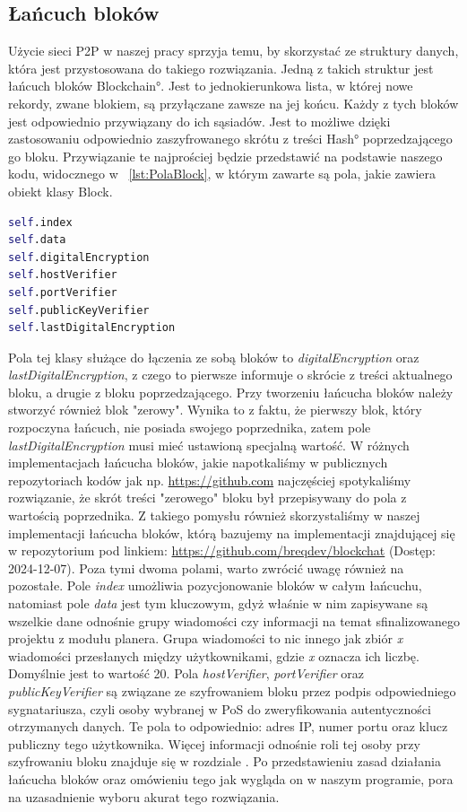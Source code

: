 \subsection{Łańcuch bloków}
\label{sec:Blockchain}
Użycie sieci P2P w naszej pracy sprzyja temu, by skorzystać ze struktury danych, która jest przystosowana do takiego rozwiązania. Jedną z takich struktur jest łańcuch bloków \ang{Blockchain}. Jest to jednokierunkowa lista, w której nowe rekordy, zwane blokiem, są przyłączane zawsze na jej końcu. Każdy z tych bloków jest odpowiednio przywiązany do ich sąsiadów. Jest to możliwe dzięki zastosowaniu odpowiednio zaszyfrowanego skrótu z treści \ang{Hash} poprzedzającego go bloku. Przywiązanie te najprościej będzie przedstawić na podstawie naszego kodu, widocznego w \lstlistingname{~\ref{lst:PolaBlock}}, w którym zawarte są pola, jakie zawiera obiekt klasy Block.
\begin{lstlisting}[language=Python, extendedchars=true, caption={Pola obiektu klasy Block} label={lst:PolaBlock}]
self.index
self.data
self.digitalEncryption
self.hostVerifier
self.portVerifier
self.publicKeyVerifier
self.lastDigitalEncryption
\end{lstlisting}
Pola tej klasy służące do łączenia ze sobą bloków to \textit{digitalEncryption} oraz \textit{lastDigitalEncryption}, z czego to pierwsze informuje o skrócie z treści aktualnego bloku, a drugie z bloku poprzedzającego. Przy tworzeniu łańcucha bloków należy stworzyć również blok "zerowy". Wynika to z faktu, że pierwszy blok, który rozpoczyna łańcuch, nie posiada swojego poprzednika, zatem pole \textit{lastDigitalEncryption} musi mieć ustawioną specjalną wartość. W różnych implementacjach łańcucha bloków, jakie napotkaliśmy w publicznych repozytoriach kodów jak np. \url{https://github.com} najczęściej spotykaliśmy rozwiązanie, że skrót treści "zerowego" bloku był przepisywany do pola z  wartością poprzednika. Z takiego pomysłu również skorzystaliśmy w naszej implementacji łańcucha bloków, którą bazujemy na implementacji znajdującej się w repozytorium pod linkiem: \url{https://github.com/breqdev/blockchat} (Dostęp: 2024-12-07). Poza tymi dwoma polami, warto zwrócić uwagę również na pozostałe. Pole \textit{index} umożliwia pozycjonowanie bloków w całym łańcuchu, natomiast pole \textit{data} jest tym kluczowym, gdyż właśnie w nim zapisywane są wszelkie dane odnośnie grupy wiadomości czy informacji na temat sfinalizowanego projektu z modułu planera. Grupa wiadomości to nic innego jak zbiór \textit{x} wiadomości przesłanych między użytkownikami, gdzie \textit{x} oznacza ich liczbę. Domyślnie jest to wartość 20. Pola \textit{hostVerifier}, \textit{portVerifier} oraz \textit{publicKeyVerifier} są związane ze szyfrowaniem bloku przez podpis odpowiedniego sygnatariusza, czyli osoby wybranej w PoS do zweryfikowania autentyczności otrzymanych danych. Te pola to odpowiednio: adres IP, numer portu oraz klucz publiczny tego użytkownika. Więcej informacji odnośnie roli tej osoby przy szyfrowaniu bloku znajduje się w rozdziale . Po przedstawieniu zasad działania łańcucha bloków oraz omówieniu tego jak wygląda on w naszym programie, pora na uzasadnienie wyboru akurat tego rozwiązania.